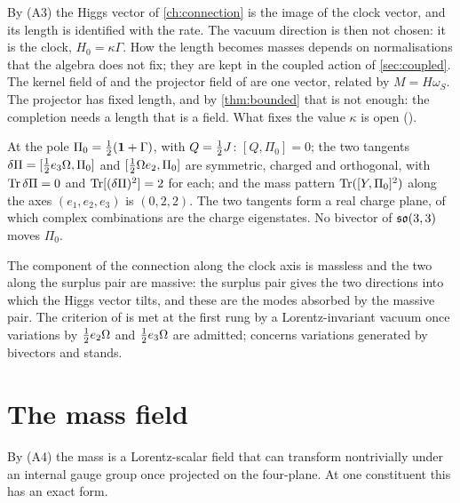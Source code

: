 By (A3) the Higgs vector of \cref{ch:connection} is the image of the clock vector, and its length is identified with the rate. The vacuum
direction is then not chosen: it is the clock, $H_0=\kappa\Gamma$. How the length becomes masses depends on normalisations that the algebra
does not fix; they are kept in the coupled action of \cref{sec:coupled}. The kernel field of  and the projector field of
 are one vector, related by $M=H\omega_S$. The projector has fixed length, and by \cref{thm:bounded} that is not enough: the
completion needs a length that is a field. What fixes the value $\kappa$ is open ().

\begin{proposition}
\label{prop:massless1}
At the pole $\Pi_0=\tfrac12(\mathbf 1+\Gamma)$, with $Q=\tfrac12 J$: $[Q,\Pi_0]=0$; the two tangents $\delta\Pi=[\tfrac12 e_3\Omega,\Pi_0]$ and
$[\tfrac12\Omega e_2,\Pi_0]$ are symmetric, charged and orthogonal, with $\operatorname{Tr}\delta\Pi=0$ and $\operatorname{Tr}[(\delta\Pi)^2]=2$ for each; and the mass
pattern $\operatorname{Tr}([Y,\Pi_0]^2)$ along the axes $(e_1,e_2,e_3)$ is $(0,2,2)$. The two tangents form a real charge plane, of which complex
combinations are the charge eigenstates. No bivector of $\mathfrak{so}(3,3)$ moves $\Pi_0$.
\end{proposition}

The component of the connection along the clock axis is massless and the two along the surplus pair are massive: the surplus pair gives the
two directions into which the Higgs vector tilts, and these are the modes absorbed by the massive pair. The criterion of  is
met at the first rung by a Lorentz-invariant vacuum once variations by $\tfrac12 e_2\Omega$ and $\tfrac12 e_3\Omega$ are admitted;
 concerns variations generated by bivectors and stands.

\section{The mass field}
\label{sec:massfield}

By (A4) the mass is a Lorentz-scalar field that can transform nontrivially under an internal gauge group once projected on the four-plane.
At one constituent this has an exact form.

